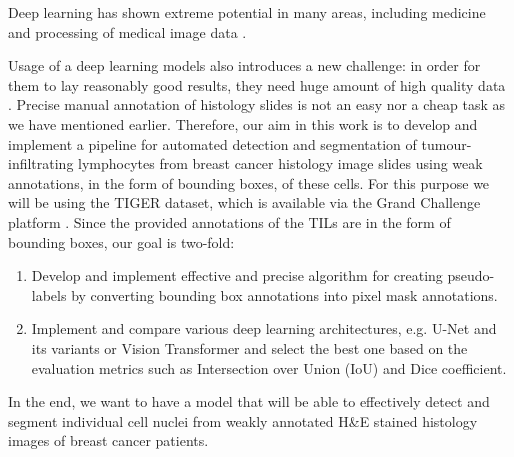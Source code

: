 Deep learning has shown extreme potential in many areas, including medicine and processing of medical image data \cite{LeCun2015}.

Usage of a deep learning models also introduces a new challenge: in order for them to lay reasonably good results, they need huge amount of high quality data \cite{Santosh2022-3}. Precise manual annotation of histology slides is not an easy nor a cheap task as we have mentioned earlier. Therefore, our aim in this work is to develop and implement a pipeline for automated detection and segmentation of tumour-infiltrating lymphocytes from breast cancer histology image slides using weak annotations, in the form of bounding boxes, of these cells. For this purpose we will be using the TIGER dataset, which is available via the Grand Challenge platform \cite{tiger_dataset}. Since the provided annotations of the TILs are in the form of bounding boxes, our goal is two-fold:

\begin{enumerate}
    \item Develop and implement effective and precise algorithm for creating pseudo-labels by converting bounding box annotations into pixel mask annotations.
    \item Implement and compare various deep learning architectures, e.g. U-Net and its variants or Vision Transformer and select the best one based on the evaluation metrics such as Intersection over Union (IoU) and Dice coefficient.
\end{enumerate}

In the end, we want to have a model that will be able to effectively detect and segment individual cell nuclei from weakly annotated H\&E stained histology images of breast cancer patients.


